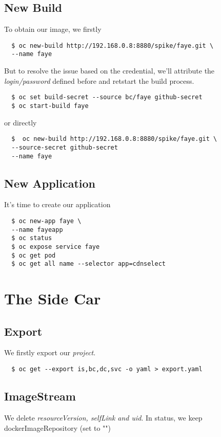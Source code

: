 \subsection{New Build}

To obtain our image, we firstly
\begin{verbatim}
  $ oc new-build http://192.168.0.8:8880/spike/faye.git \
  --name faye
\end{verbatim}

But to resolve the issue based on the credential, we'll attribute the \emph{login/password} defined before and retstart the build process.

\begin{verbatim}
  $ oc set build-secret --source bc/faye github-secret
  $ oc start-build faye
\end{verbatim}

or directly
\begin{verbatim}
  $  oc new-build http://192.168.0.8:8880/spike/faye.git \
  --source-secret github-secret
  --name faye
\end{verbatim}

\subsection{New Application}

It's time to create our application

\begin{verbatim}
  $ oc new-app faye \
  --name fayeapp
  $ oc status
  $ oc expose service faye
  $ oc get pod
  $ oc get all name --selector app=cdnselect
\end{verbatim}

\section{The Side Car}

\subsection{Export}

We firstly export our \emph{project}.

\begin{verbatim}
  $ oc get --export is,bc,dc,svc -o yaml > export.yaml
\end{verbatim}

\subsection{ImageStream}
We delete \emph{resourceVersion, selfLink and uid}. In status, we keep dockerImageRepository (set to "")

